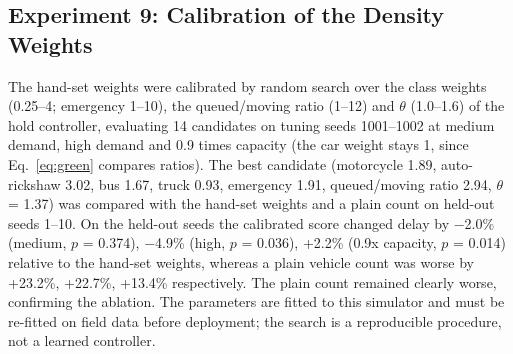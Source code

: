 \begin{table}[H]
\centering
\caption{Delay under imperfect sensing (s): medium demand / 0.9 times capacity}
\label{tab:sensing}
\small
{}
\par{}
\end{table}


\subsection{Experiment 9: Calibration of the Density Weights}
\label{sec:calib}
The hand-set weights were calibrated by random search over the class weights (0.25--4; emergency 1--10), the queued/moving ratio (1--12) and $\theta$ (1.0--1.6) of the hold controller, evaluating 14 candidates on tuning seeds 1001--1002 at medium demand, high demand and 0.9 times capacity (the car weight stays 1, since Eq.~\eqref{eq:green} compares ratios). The best candidate (motorcycle 1.89, auto-rickshaw 3.02, bus 1.67, truck 0.93, emergency 1.91, queued/moving ratio 2.94, $\theta$ = 1.37) was compared with the hand-set weights and a plain count on held-out seeds 1--10. On the held-out seeds the calibrated score changed delay by $-$2.0\% (medium, $p$ = 0.374), $-$4.9\% (high, $p$ = 0.036), +2.2\% (0.9x capacity, $p$ = 0.014) relative to the hand-set weights, whereas a plain vehicle count was worse by +23.2\%, +22.7\%, +13.4\% respectively. The plain count remained clearly worse, confirming the ablation. The parameters are fitted to this simulator and must be re-fitted on field data before deployment; the search is a reproducible procedure, not a learned controller.

